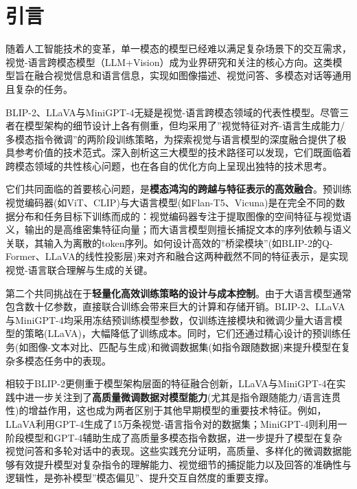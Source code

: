 \documentclass{article}
\author{}
\begin{document}
    
\section{引言}\label{ux4e00ux5f15ux8a00}
随着人工智能技术的变革，单一模态的模型已经难以满足复杂场景下的交互需求，视觉-语言跨模态模型（LLM+Vision）成为业界研究和关注的核心方向。这类模型旨在融合视觉信息和语言信息，实现如图像描述、视觉问答、多模态对话等通用且复杂的任务。

BLIP-2、LLaVA与MiniGPT-4无疑是视觉-语言跨模态领域的代表性模型。尽管三者在模型架构的细节设计上各有侧重，但均采用了''视觉特征对齐-语言生成能力/多模态指令微调''的两阶段训练策略，为探索视觉与语言模型的深度融合提供了极具参考价值的技术范式。深入剖析这三大模型的技术路径可以发现，它们既面临着跨模态领域的共性核心问题，也在各自的优化方向上呈现出独特的技术思考。

它们共同面临的首要核心问题，是\textbf{模态鸿沟的跨越与特征表示的高效融合}。预训练视觉编码器(如ViT、CLIP)与大语言模型(如Flan-T5、Vicuna)是在完全不同的数据分布和任务目标下训练而成的：视觉编码器专注于提取图像的空间特征与视觉语义，输出的是高维密集特征向量；而大语言模型则擅长捕捉文本的序列依赖与语义关联，其输入为离散的token序列。如何设计高效的''桥梁模块''(如BLIP-2的Q-Former、LLaVA的线性投影层)来对齐和融合这两种截然不同的特征表示，是实现视觉-语言联合理解与生成的关键。

第二个共同挑战在于\textbf{轻量化高效训练策略的设计与成本控制}。由于大语言模型通常包含数十亿参数，直接联合训练会带来巨大的计算和存储开销。BLIP-2、LLaVA与MiniGPT-4均采用冻结预训练模型参数，仅训练连接模块和微调少量大语言模型的策略(LLaVA)，大幅降低了训练成本。同时，它们还通过精心设计的预训练任务(如图像-文本对比、匹配与生成)和微调数据集(如指令跟随数据)来提升模型在复杂多模态任务中的表现。

相较于BLIP-2更侧重于模型架构层面的特征融合创新，LLaVA与MiniGPT-4在实践中进一步关注到了\textbf{高质量微调数据对模型能力}(尤其是指令跟随能力/语言连贯性)的增益作用，这也成为两者区别于其他早期模型的重要技术特征。例如，LLaVA利用GPT-4生成了15万条视觉-语言指令对的数据集；MiniGPT-4则利用一阶段模型和GPT-4辅助生成了高质量多模态指令数据，进一步提升了模型在复杂视觉问答和多轮对话中的表现。这些实践充分证明，高质量、多样化的微调数据能够有效提升模型对复杂指令的理解能力、视觉细节的捕捉能力以及回答的准确性与逻辑性，是弥补模型''模态偏见''、提升交互自然度的重要支撑。
\end{document}
